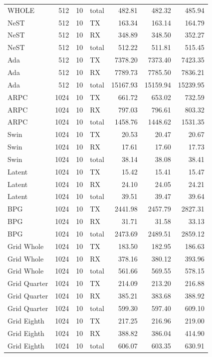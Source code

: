 \documentclass[10pt,letterpaper]{article}
\begin{document}
\begin{longtable}{@{}lrrlrrr@{}}
WHOLE & 512 & 10 & total & 482.81 & 482.32 & 485.94\\
NeST & 512 & 10 & TX & 163.34 & 163.14 & 164.79\\
NeST & 512 & 10 & RX & 348.89 & 348.50 & 352.27\\
NeST & 512 & 10 & total & 512.22 & 511.81 & 515.45\\
Ada & 512 & 10 & TX & 7378.20 & 7373.40 & 7423.35\\
Ada & 512 & 10 & RX & 7789.73 & 7785.50 & 7836.21\\
Ada & 512 & 10 & total & 15167.93 & 15159.94 & 15239.95\\
ARPC & 1024 & 10 & TX & 661.72 & 653.02 & 732.59\\
ARPC & 1024 & 10 & RX & 797.03 & 796.61 & 803.32\\
ARPC & 1024 & 10 & total & 1458.76 & 1448.62 & 1531.35\\
Swin & 1024 & 10 & TX & 20.53 & 20.47 & 20.67\\
Swin & 1024 & 10 & RX & 17.61 & 17.60 & 17.73\\
Swin & 1024 & 10 & total & 38.14 & 38.08 & 38.41\\
Latent & 1024 & 10 & TX & 15.42 & 15.41 & 15.47\\
Latent & 1024 & 10 & RX & 24.10 & 24.05 & 24.21\\
Latent & 1024 & 10 & total & 39.51 & 39.47 & 39.64\\
BPG & 1024 & 10 & TX & 2441.98 & 2457.79 & 2827.31\\
BPG & 1024 & 10 & RX & 31.71 & 31.58 & 33.13\\
BPG & 1024 & 10 & total & 2473.69 & 2489.51 & 2859.12\\
Grid Whole & 1024 & 10 & TX & 183.50 & 182.95 & 186.63\\
Grid Whole & 1024 & 10 & RX & 378.16 & 380.12 & 393.96\\
Grid Whole & 1024 & 10 & total & 561.66 & 569.55 & 578.15\\
Grid Quarter & 1024 & 10 & TX & 214.09 & 213.20 & 216.88\\
Grid Quarter & 1024 & 10 & RX & 385.21 & 383.68 & 388.92\\
Grid Quarter & 1024 & 10 & total & 599.30 & 597.40 & 609.10\\
Grid Eighth & 1024 & 10 & TX & 217.25 & 216.96 & 219.00\\
Grid Eighth & 1024 & 10 & RX & 388.82 & 386.04 & 414.90\\
Grid Eighth & 1024 & 10 & total & 606.07 & 603.35 & 630.91\\
\bottomrule\end{longtable}
\end{document}
